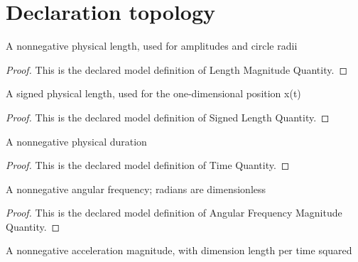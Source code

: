 \section{Declaration topology}
\begin{definition}
  \label{def:physics:phyx-mini-0273:phyxminiproblems-problemphyxmini0273-lengthmagnitudequantity}
  A nonnegative physical length, used for amplitudes and circle radii
\end{definition}
\begin{proof}
  This is the declared model definition of Length Magnitude Quantity.
\end{proof}
\begin{definition}
  \label{def:physics:phyx-mini-0273:phyxminiproblems-problemphyxmini0273-signedlengthquantity}
  A signed physical length, used for the one-dimensional position x(t)
\end{definition}
\begin{proof}
  This is the declared model definition of Signed Length Quantity.
\end{proof}
\begin{definition}
  \label{def:physics:phyx-mini-0273:phyxminiproblems-problemphyxmini0273-timequantity}
  A nonnegative physical duration
\end{definition}
\begin{proof}
  This is the declared model definition of Time Quantity.
\end{proof}
\begin{definition}
  \label{def:physics:phyx-mini-0273:phyxminiproblems-problemphyxmini0273-angularfrequencymagnitudequantity}
  A nonnegative angular frequency; radians are dimensionless
\end{definition}
\begin{proof}
  This is the declared model definition of Angular Frequency Magnitude Quantity.
\end{proof}
\begin{definition}
  \label{def:physics:phyx-mini-0273:phyxminiproblems-problemphyxmini0273-accelerationmagnitudequantity}
  A nonnegative acceleration magnitude, with dimension length per time squared
\end{definition}
